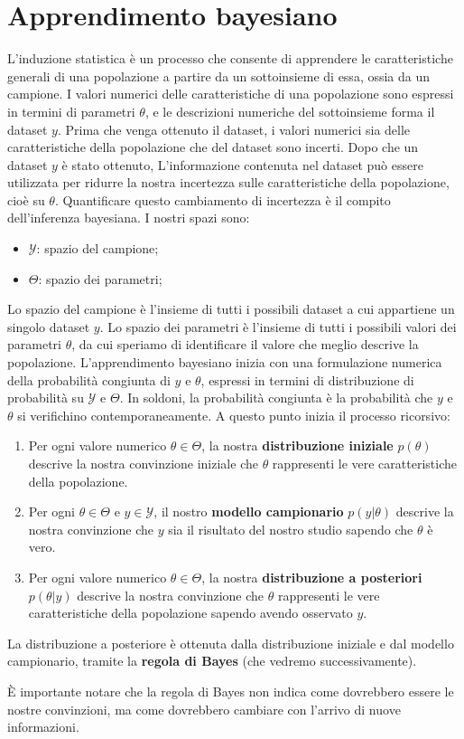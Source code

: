 \documentclass[../main.tex]{subfiles}
\begin{document}
\section{Apprendimento bayesiano}
L'induzione statistica è un processo che consente di apprendere le caratteristiche generali di una popolazione a partire da un sottoinsieme di essa, ossia da un campione.
I valori numerici delle caratteristiche di una popolazione sono espressi in termini di parametri $\theta$, e le descrizioni numeriche del sottoinsieme forma il dataset $y$.
Prima che venga ottenuto il dataset, i valori numerici sia delle caratteristiche della popolazione che del dataset sono incerti. Dopo che un dataset $y$ è stato ottenuto,
L'informazione contenuta nel dataset può essere utilizzata per ridurre la nostra incertezza sulle caratteristiche della popolazione, cioè su $\theta$.
Quantificare questo cambiamento di incertezza è il compito dell'inferenza bayesiana.
I nostri spazi sono:
\begin{itemize}
    \item $\mathcal{Y}$: spazio del campione;
    \item $\Theta$: spazio dei parametri;
\end{itemize}
Lo spazio del campione è l'insieme di tutti i possibili dataset a cui appartiene un singolo dataset $y$.
Lo spazio dei parametri è l'insieme di tutti i possibili valori dei parametri $\theta$, da cui speriamo di identificare il valore che meglio descrive la popolazione.
\hfill \break
L'apprendimento bayesiano inizia con una formulazione numerica della probabilità congiunta di $y$ e $\theta$, espressi in termini di distribuzione di probabilità su $\mathcal{Y}$
e $\Theta$.
In soldoni, la probabilità congiunta è la probabilità che $y$ e $\theta$ si verifichino contemporaneamente.
A questo punto inizia il processo ricorsivo:
\begin{enumerate}
    \item Per ogni valore numerico $\theta \in \Theta$, la nostra \textbf{distribuzione iniziale} $p(\theta)$ descrive la nostra convinzione iniziale che $\theta$ rappresenti le vere caratteristiche della popolazione.
    \item Per ogni $\theta \in \Theta$ e $y \in \mathcal{Y}$, il nostro \textbf{modello campionario} $p(y|\theta)$ descrive la nostra convinzione che $y$ sia il risultato del nostro studio sapendo che $\theta$ è vero.
    \item Per ogni valore numerico $\theta \in \Theta$, la nostra \textbf{distribuzione a posteriori} $p(\theta|y)$ descrive la nostra convinzione che $\theta$ rappresenti le vere caratteristiche della popolazione sapendo avendo osservato $y$.
\end{enumerate}
La distribuzione a posteriore è ottenuta dalla distribuzione iniziale e dal modello campionario, tramite la \textbf{regola di Bayes} (che vedremo successivamente).
\begin{remark}
    È importante notare che la regola di Bayes non indica come dovrebbero essere le nostre convinzioni, ma come dovrebbero cambiare con l'arrivo di nuove informazioni.
\end{remark}
\end{document}

